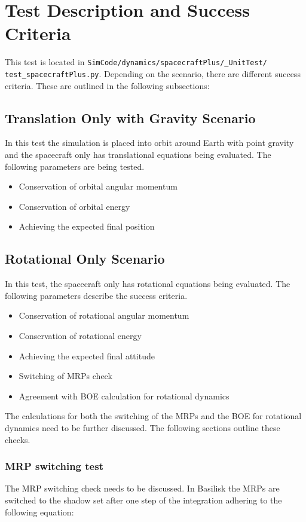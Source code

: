 
\section{Test Description and Success Criteria}
This test is located in \texttt{SimCode/dynamics/spacecraftPlus/\_UnitTest/\newline
test\_spacecraftPlus.py}. Depending on the scenario, there are different success criteria. These are outlined in the following subsections:
\subsection{Translation Only with Gravity Scenario}
In this test the simulation is placed into orbit around Earth with point gravity and the spacecraft only has translational equations being evaluated. The following parameters are being tested. 
\begin{itemize}
	\item Conservation of orbital angular momentum
	\item Conservation of orbital energy
	\item Achieving the expected final position
\end{itemize}

\subsection{Rotational Only Scenario}
In this test, the spacecraft only has rotational equations being evaluated. The following parameters describe the success criteria.
\begin{itemize}
\item Conservation of rotational angular momentum
\item Conservation of rotational energy
\item Achieving the expected final attitude
\item Switching of MRPs check
\item Agreement with BOE calculation for rotational dynamics
\end{itemize}
The calculations for both the switching of the MRPs and the BOE for rotational dynamics need to be further discussed. The following sections outline these checks.

\subsubsection{MRP switching test} 
The MRP switching check needs to be discussed. In Basilisk the MRPs are switched to the shadow set after one step of the integration adhering to the following equation\cite{schaub}:

